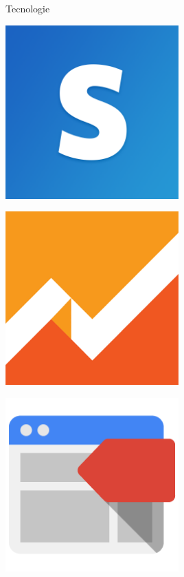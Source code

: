 \begin{frame}{Tecnologie}
\begin{minipage}{\textwidth}
\begin{minipage}{0.49\textwidth}
					\begin{minipage}{0.48\textwidth}
						\begin{flushright}
							\includegraphics[width=0.5\textwidth]{capitolo_2/immagini/stripe.png}
						\end{flushright}
					\end{minipage}
					\begin{minipage}{0.48\textwidth}
						\includegraphics[width=0.5\textwidth]{capitolo_2/immagini/google_analytics.png}
					\end{minipage}\par
					\vspace{0.02\textwidth}
					\begin{minipage}{0.48\textwidth}
						\begin{flushright}
							\includegraphics[width=0.5\textwidth]{capitolo_2/immagini/google_tag_manager.png}

\end{flushright}
\end{minipage}
\end{minipage}
\end{minipage}
\end{frame}

